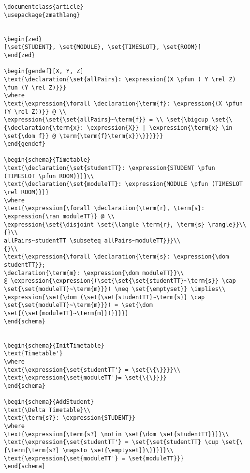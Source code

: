 \begin{verbatim}
\documentclass{article}
\usepackage{zmathlang}


\begin{zed}
[\set{STUDENT}, \set{MODULE}, \set{TIMESLOT}, \set{ROOM}]
\end{zed}

\begin{gendef}[X, Y, Z]
\text{\declaration{\set{allPairs}: \expression{(X \pfun ( Y \rel Z) \fun (Y \rel Z)}}}
\where
\text{\expression{\forall \declaration{\term{f}: \expression{(X \pfun (Y \rel Z))}} @ \\
\expression{\set{\set{allPairs}~\term{f}} = \\ \set{\bigcup \set{\{\declaration{\term{x}: \expression{X}} | \expression{\term{x} \in \set{\dom f}} @ \term{\term{f}\term{x}}\}}}}}}
\end{gendef}

\begin{schema}{Timetable}
\text{\declaration{\set{studentTT}: \expression{STUDENT \pfun (TIMESLOT \pfun ROOM)}}}\\
\text{\declaration{\set{moduleTT}: \expression{MODULE \pfun (TIMESLOT \rel ROOM)}}}
\where
\text{\expression{\forall \declaration{\term{r}, \term{s}: \expression{\ran moduleTT}} @ \\
\expression{\set{\disjoint \set{\langle \term{r}, \term{s} \rangle}}\\
{}\\
allPairs~studentTT \subseteq allPairs~moduleTT}}}\\
{}\\
\text{\expression{\forall \declaration{\term{s}: \expression{\dom studentTT}}; 
\declaration{\term{m}: \expression{\dom moduleTT}}\\
@ \expression{\expression{(\set{\set{\set{studentTT}~\term{s}} \cap \set{\set{moduleTT}~\term{m}}}) \neq \set{\emptyset}} \implies\\
\expression{\set{\dom (\set{\set{studentTT}~\term{s}} \cap \set{\set{moduleTT}~\term{m}}}) = \set{\dom \set{(\set{moduleTT}~\term{m}})}}}}}
\end{schema}


\begin{schema}{InitTimetable}
\text{Timetable'}
\where
\text{\expression{\set{studentTT'} = \set{\{\}}}}\\
\text{\expression{\set{moduleTT'}= \set{\{\}}}}
\end{schema}

\begin{schema}{AddStudent}
\text{\Delta Timetable}\\
\text{\term{s?}: \expression{STUDENT}}
\where
\text{\expression{\term{s?} \notin \set{\dom \set{studentTT}}}}\\
\text{\expression{\set{studentTT'} = \set{\set{studentTT} \cup \set{\{\term{\term{s?} \mapsto \set{\emptyset}}\}}}}}\\
\text{\expression{\set{moduleTT'} = \set{moduleTT}}}
\end{schema}


\end{verbatim}
